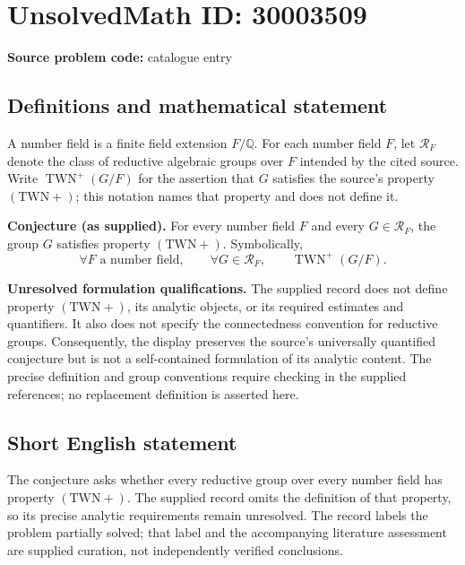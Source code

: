 \documentclass[11pt]{article}
\newcommand{\Q}{\mathbb{Q}}
\begin{document}
\section*{UnsolvedMath ID: 30003509}
\textbf{Source problem code:} catalogue entry
\subsection{Definitions and mathematical statement}
A number field is a finite field extension \(F/\Q\). For each number field \(F\), let \(\mathcal R_F\) denote the class of reductive algebraic groups over \(F\) intended by the cited source. Write \(\operatorname{TWN}^{+}(G/F)\) for the assertion that \(G\) satisfies the source's property \((\mathrm{TWN}+ )\); this notation names that property and does not define it.

\textbf{Conjecture (as supplied).} For every number field \(F\) and every \(G\in\mathcal R_F\), the group \(G\) satisfies property \((\mathrm{TWN}+ )\). Symbolically,
\[
\forall F\text{ a number field},\qquad
\forall G\in\mathcal R_F,\qquad
\operatorname{TWN}^{+}(G/F).
\]

\textbf{Unresolved formulation qualifications.} The supplied record does not define property \((\mathrm{TWN}+ )\), its analytic objects, or its required estimates and quantifiers. It also does not specify the connectedness convention for reductive groups. Consequently, the display preserves the source's universally quantified conjecture but is not a self-contained formulation of its analytic content. The precise definition and group conventions require checking in the supplied references; no replacement definition is asserted here.
\subsection{Short English statement}
The conjecture asks whether every reductive group over every number field has property \((\mathrm{TWN}+ )\). The supplied record omits the definition of that property, so its precise analytic requirements remain unresolved. The record labels the problem partially solved; that label and the accompanying literature assessment are supplied curation, not independently verified conclusions.
\end{document}
